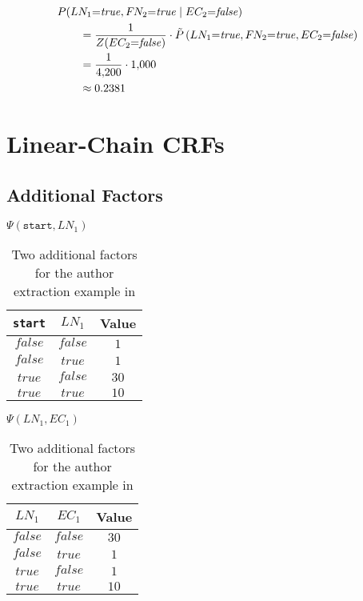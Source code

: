 \begin{subequations}
\begin{equation*}
\begin{split}
  &P(LN_1{=}\mathit{true},F\hspace{-0.07em} N_2{=}\mathit{true}\mid EC_2{=}\mathit{false})\\
  &\hspace{2em}=\frac{1}{Z(EC_2{=}\mathit{false})}\cdot\tilde{P}\left(LN_1{=}\mathit{true},F\hspace{-0.07em} N_2{=}\mathit{true},EC_2{=}\mathit{false}\right)\\
  &\hspace{2em}=\frac{1}{\num{4200}}\cdot\num{1000}\\
  &\hspace{2em}\approx0.2381\\
\end{split}
\end{equation*}
\end{subequations}
\section{Linear-Chain CRFs}\label{app:sec-linear-chain-crfs}
\subsection{Additional Factors}\label{app:subsec-lccrf-additional-factors}

\begin{table}[H]
\begin{minipage}{0.5\linewidth}
\centering
$\Psi(\texttt{start},LN_1)$\par
\smallskip
\begin{tabular}{c c c}
 \toprule
 \texttt{start} & $LN_1$ & Value \\
 \midrule
 $\mathit{false}$ & $\mathit{false}$ & $1$ \\
 $\mathit{false}$ & $\mathit{true}$ & $1$ \\
 $\mathit{true}$ & $\mathit{false}$ & $30$ \\
 $\mathit{true}$ & $\mathit{true}$ & $10$ \\
 \bottomrule
\end{tabular}
\end{minipage}
\hfill
\begin{minipage}{0.5\linewidth}
\centering
$\Psi(LN_1,EC_1)$\par
\smallskip
\begin{tabular}{c c c}
 \toprule
 $LN_1$ & $EC_1$ & Value \\
 \midrule
 $\mathit{false}$ & $\mathit{false}$ & $30$ \\
 $\mathit{false}$ & $\mathit{true}$ & $1$ \\
 $\mathit{true}$ & $\mathit{false}$ & $1$ \\
 $\mathit{true}$ & $\mathit{true}$ & $10$ \\
 \bottomrule
\end{tabular}
\end{minipage}
\caption{Two additional factors for the author extraction example in }
\label{tab:example-linear-chain-crf-factors}
\end{table}

